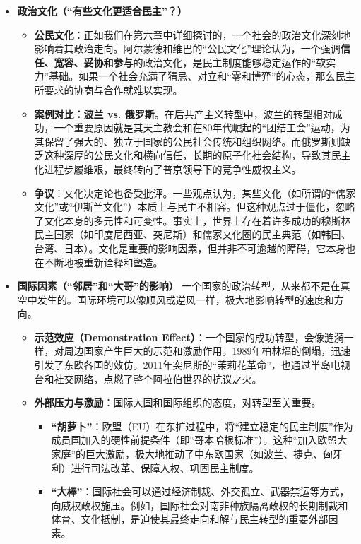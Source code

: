 \begin{itemize}
\begin{itemize}
    \end{itemize}
    \item \textbf{政治文化（“有些文化更适合民主”？）}
    \begin{itemize}
        \item \textbf{公民文化}：正如我们在第六章中详细探讨的，一个社会的政治文化深刻地影响着其政治走向。阿尔蒙德和维巴的“公民文化”理论认为，一个强调\textbf{信任、宽容、妥协和参与}的政治文化，是民主制度能够稳定运作的“软实力”基础。如果一个社会充满了猜忌、对立和“零和博弈”的心态，那么民主所要求的协商与合作就难以实现。
        \item \textbf{案例对比：波兰 vs. 俄罗斯}。在后共产主义转型中，波兰的转型相对成功，一个重要原因就是其天主教会和在80年代崛起的“团结工会”运动，为其保留了强大的、独立于国家的公民社会传统和组织网络。而俄罗斯则缺乏这种深厚的公民文化和横向信任，长期的原子化社会结构，导致其民主化进程步履维艰，最终转向了普京领导下的竞争性威权主义。
        \item \textbf{争议}：文化决定论也备受批评。一些观点认为，某些文化（如所谓的“儒家文化”或“伊斯兰文化”）本质上与民主不相容。但这种观点过于僵化，忽略了文化本身的多元性和可变性。事实上，世界上存在着许多成功的穆斯林民主国家（如印度尼西亚、突尼斯）和儒家文化圈的民主典范（如韩国、台湾、日本）。文化是重要的影响因素，但并非不可逾越的障碍，它本身也在不断地被重新诠释和塑造。
    \end{itemize}
    \item \textbf{国际因素（“邻居”和“大哥”的影响）}
    一个国家的政治转型，从来都不是在真空中发生的。国际环境可以像顺风或逆风一样，极大地影响转型的速度和方向。
    \begin{itemize}
        \item \textbf{示范效应（Demonstration Effect）}：一个国家的成功转型，会像涟漪一样，对周边国家产生巨大的示范和激励作用。1989年柏林墙的倒塌，迅速引发了东欧各国的效仿。2011年突尼斯的“茉莉花革命”，也通过半岛电视台和社交网络，点燃了整个阿拉伯世界的抗议之火。
        \item \textbf{外部压力与激励}：国际大国和国际组织的态度，对转型至关重要。
        \begin{itemize}
            \item \textbf{“胡萝卜”}：欧盟（EU）在东扩过程中，将“建立稳定的民主制度”作为成员国加入的硬性前提条件（即“哥本哈根标准”）。这种“加入欧盟大家庭”的巨大激励，极大地推动了中东欧国家（如波兰、捷克、匈牙利）进行司法改革、保障人权、巩固民主制度。
            \item \textbf{“大棒”}：国际社会可以通过经济制裁、外交孤立、武器禁运等方式，向威权政权施压。例如，国际社会对南非种族隔离政权的长期制裁和体育、文化抵制，是迫使其最终走向和解与民主转型的重要外部因素。

\end{itemize}
\end{itemize}
\end{itemize}
